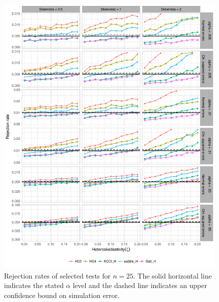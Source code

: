 \documentclass[12pt]{article}\usepackage[]{graphicx}\usepackage[]{color}
\newenvironment{knitrout}{}{} %
\begin{document}
\begin{knitrout}
\color{fgcolor}\begin{figure}[p]

{\centering \includegraphics[width=\linewidth]{HC_fig/selected_size_25-1} 

}

\caption[Rejection rates of selected tests for $n = 25$]{Rejection rates of selected tests for $n = 25$. The solid horizontal line indicates the stated $\alpha$ level and the dashed line indicates an upper confidence bound on simulation error.}\label{fig:selected_size_25}
\end{figure}


\end{knitrout}
\end{document}
